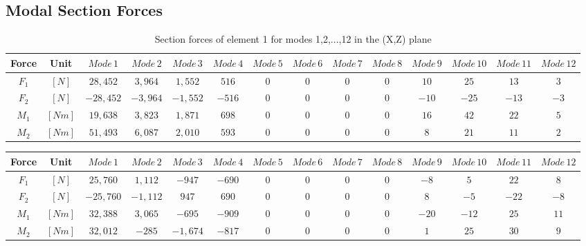 \documentclass[11pt,a4paper,titlepage]{report}
\begin{document}
\begin{appendix}
\chapter{Modal Section Forces}\label{sec: appendix A}
\begin{landscape}
\begin{table}[]
    \centering
    \begin{tiny}
    \begin{tabular}{c|c|c|c|c|c|c|c|c|c|c|c|c|c}
    Force & Unit & $Mode\,1$ & $Mode\,2$ & $Mode\,3$ & $Mode\,4$ & $Mode\,5$ & $Mode\,6$ & $Mode\,7$ & $Mode\,8$ & $Mode\,9$ & $Mode\,10$ & $Mode\,11$ & $Mode\,12$\\
    \hline
   $F_1$ & $[N]$ & $28,452$ & $3,964$ & $1,552$ & $516$ & $0$ & $0$ & $0$ & $0$ & $10$ & $25$ & $13$ &  $3$\\
   $F_2$ & $[N]$ & $-28,452$ & $-3,964$ & $-1,552$ & $-516$ & $0$ & $0$ & $0$ & $0$ & $-10$ & $-25$ & $-13$ &  $-3$\\
    $M_1$ & $[Nm]$ & $19,638$ & $3,823$ & $1,871$ & $698$ & $0$ & $0$ & $0$ & $0$ & $16$ & $42$ & $22$ &  $5$\\
    $M_2$ & $[Nm]$ & $ 51,493 $ &  $6,087$ &  $2,010$ &  $593$ & $0$ & $0$ & $0$ & $0$ & $8$ & $21$ & $11$ & $2$\\
        \end{tabular}
        \end{tiny}
    \caption{Section forces of element 1 for modes 1,2,...,12 in the (X,Z) plane}
    \label{tab:my_label}
\end{table}
\newpage
\begin{table}[]
    \centering
    \begin{tiny}
    \begin{tabular}{c|c|c|c|c|c|c|c|c|c|c|c|c|c}
    Force & Unit & $Mode\,1$ & $Mode\,2$ & $Mode\,3$ & $Mode\,4$ & $Mode\,5$ & $Mode\,6$ & $Mode\,7$ & $Mode\,8$ & $Mode\,9$ & $Mode\,10$ & $Mode\,11$ & $Mode\,12$\\
    \hline
   $F_1$ & $[N]$ & $25,760$ & $1,112$ & $-947$ & $-690$ & $0$ & $0$ & $0$ & $0$ & $-8$ & $5$ & $22$ &  $8$\\
   $F_2$ & $[N]$ & $-25,760$ & $-1,112$ & $947$ & $690$ & $0$ & $0$ & $0$ & $0$ & $8$ & $-5$ & $-22$ &  $-8$\\
    $M_1$ & $[Nm]$ & $32,388$ & $3,065$ & $-695$ & $-909$ & $0$ & $0$ & $0$ & $0$ & $-20$ & $-12$ & $25$ &  $11$\\
    $M_2$ & $[Nm]$ & $32,012$ &  $-285$ &  $-1,674 $ &  $-817$ & $0$ & $0$ & $0$ & $0$ & $1$ & $25$ & $30$ & $9$\\

\end{tabular}
\end{tiny}
\end{table}
\end{landscape}
\end{appendix}
\end{document}
